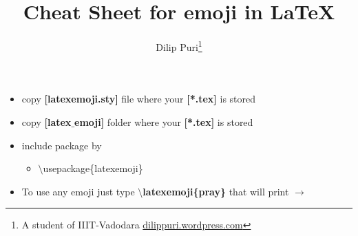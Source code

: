 \documentclass{article}
\title{Cheat Sheet for emoji in \LaTeX}
\author{Dilip Puri\footnote{A student of IIIT-Vadodara \url{dilippuri.wordpress.com}}}
\begin{document}
\maketitle

\begin{itemize}
\item[\latexemoji{point_right}] copy \textbf{[latexemoji.sty]} file where your \textbf{[*.tex]} is stored
\item[\latexemoji{point_right}] copy \textbf{[latex$\_$emoji]} folder where your \textbf{[*.tex]} is stored
\item[\latexemoji{point_right}] include package by
	\begin{itemize}
		\item $\setminus$usepackage\{latexemoji\} 
	\end{itemize}
\item[\latexemoji{point_right}] To use any emoji just type \textbf{$\setminus$latexemoji\{pray\}} that will print $\rightarrow$ 
\end{itemize}
\end{document}
